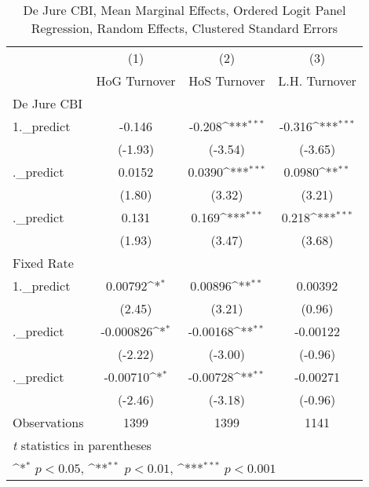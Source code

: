 \begin{table}[htbp]\centering
\def\sym#1{\ifmmode^{#1}\else\(^{#1}\)\fi}
\caption{De Jure CBI, Mean Marginal Effects, Ordered Logit Panel Regression, Random Effects, Clustered Standard Errors \label{ordLogDJ}}
\begin{tabular}{l*{3}{c}}
\toprule
                                        &\multicolumn{1}{c}{(1)}&\multicolumn{1}{c}{(2)}&\multicolumn{1}{c}{(3)}\\
                                        &\multicolumn{1}{c}{HoG Turnover}&\multicolumn{1}{c}{HoS Turnover}&\multicolumn{1}{c}{L.H. Turnover}\\
\midrule
De Jure CBI                             &                  &                  &                  \\
1.\_predict                              &   -0.146         &   -0.208\sym{***}&   -0.316\sym{***}\\
                                        &  (-1.93)         &  (-3.54)         &  (-3.65)         \\
\addlinespace
2.\_predict                              &   0.0152         &   0.0390\sym{***}&   0.0980\sym{**} \\
                                        &   (1.80)         &   (3.32)         &   (3.21)         \\
\addlinespace
3.\_predict                              &    0.131         &    0.169\sym{***}&    0.218\sym{***}\\
                                        &   (1.93)         &   (3.47)         &   (3.68)         \\
\midrule
Fixed Rate                              &                  &                  &                  \\
1.\_predict                              &  0.00792\sym{*}  &  0.00896\sym{**} &  0.00392         \\
                                        &   (2.45)         &   (3.21)         &   (0.96)         \\
\addlinespace
2.\_predict                              &-0.000826\sym{*}  & -0.00168\sym{**} & -0.00122         \\
                                        &  (-2.22)         &  (-3.00)         &  (-0.96)         \\
\addlinespace
3.\_predict                              & -0.00710\sym{*}  & -0.00728\sym{**} & -0.00271         \\
                                        &  (-2.46)         &  (-3.18)         &  (-0.96)         \\
\midrule
Observations                            &     1399         &     1399         &     1141         \\
\bottomrule
\multicolumn{4}{l}{\footnotesize \textit{t} statistics in parentheses}\\
\multicolumn{4}{l}{\footnotesize \sym{*} \(p<0.05\), \sym{**} \(p<0.01\), \sym{***} \(p<0.001\)}\\
\end{tabular}
\end{table}
